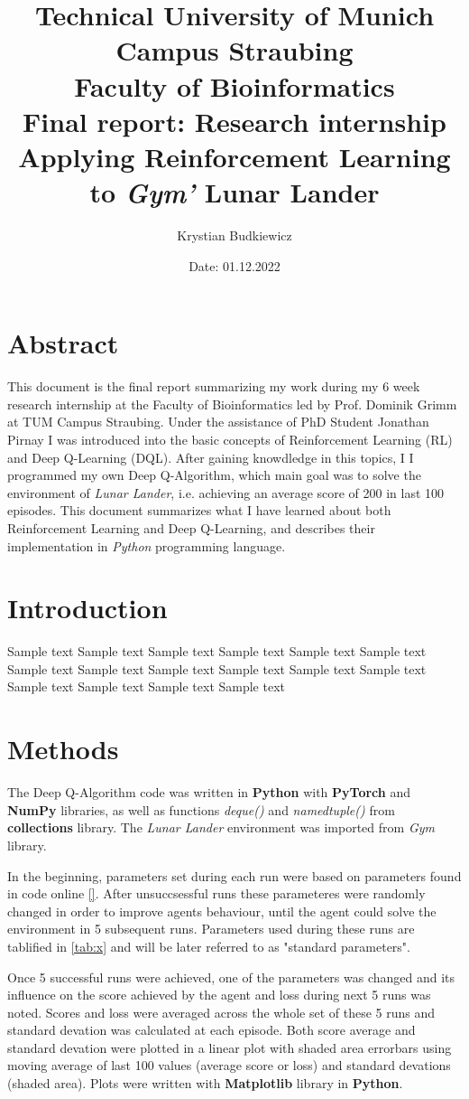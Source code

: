 \documentclass{article}
\title{
  \textbf{
    \huge Technical University of Munich \\ Campus Straubing \\ Faculty of Bioinformatics
      }\\
  \vspace{0,25cm}
  \huge Final report: Research internship \\ Applying Reinforcement Learning to \textit{Gym'} Lunar      Lander
  }
\author{Krystian Budkiewicz}
\date{Date: 01.12.2022}
\begin{document}
\newpage
\section*{Abstract}
This document is the final report summarizing my work during my 6 week research internship at the Faculty of Bioinformatics led by Prof. Dominik Grimm at TUM Campus Straubing. Under the assistance of PhD Student Jonathan Pirnay I was introduced into the basic concepts of Reinforcement Learning (RL) and Deep Q-Learning (DQL). After gaining knowdledge in this topics, I I programmed my own Deep Q-Algorithm, which main goal was to solve the environment of \textit{Lunar Lander}, i.e. achieving an average score of 200 in last 100 episodes.
This document summarizes what I have learned about both Reinforcement Learning and Deep Q-Learning, and describes their implementation in \textit{Python} programming language.

\newpage
\section*{Introduction}
Sample text Sample text Sample text Sample text Sample text Sample text Sample text Sample text
Sample text Sample text Sample text Sample text Sample text Sample text Sample text Sample text
\\

\section*{Methods}
The Deep Q-Algorithm code was written in \textbf{Python} with \textbf{PyTorch} and \textbf{NumPy} libraries, as well as functions \textit{deque()} and \textit{namedtuple()} from \textbf{collections} library. The \textit{Lunar Lander} environment was imported from \textit{Gym} library.

In the beginning, parameters set during each run were based on parameters found in code online \ref{}. After unsuccsessful runs these parameteres were randomly changed in order to improve agents behaviour, until the agent could solve the environment in 5 subsequent runs. Parameters used during these runs are tablified in \ref{tab:x} and will be later referred to as "standard parameters".

Once 5 successful runs were achieved, one of the parameters was changed and its influence on the score achieved by the agent and loss during next 5 runs was noted. Scores and loss were averaged across the whole set of these 5 runs and standard devation was calculated at each episode. Both score average and standard devation were plotted in a linear plot with shaded area errorbars using moving average of last 100 values (average score or loss) and standard devations (shaded area). Plots were written with \textbf{Matplotlib} library in \textbf{Python}.
\end{document}
